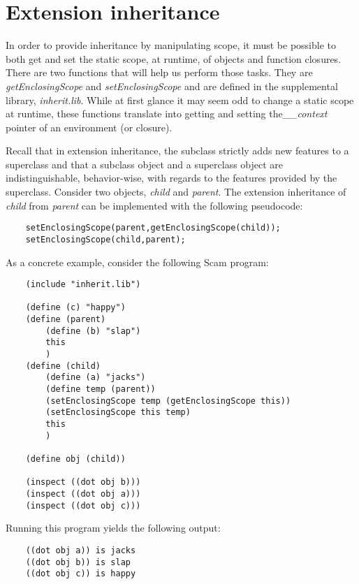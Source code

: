 \section{Extension inheritance}

In order to provide inheritance by manipulating scope, it must be
possible to both get and set the static scope, at runtime, of objects
and function closures.  There are two functions that will help us
perform those tasks. They are
{\it getEnclosingScope} and {\it setEnclosingScope} and are defined
in the supplemental library, {\it inherit.lib}.
While at first
glance it may seem odd to change a static scope at runtime,
these functions translate into getting and setting
the{\it  \_\_context} pointer of an environment (or closure).

Recall that in extension inheritance, the subclass strictly adds
new features to a superclass and that a subclass object and a
superclass object are indistinguishable, behavior-wise, with regards
to the features provided by the superclass.  
Consider two objects, {\it child} and {\it parent}. The extension
inheritance of {\it child} from {\it parent} can be implemented with
the following pseudocode:

\begin{verbatim}
    setEnclosingScope(parent,getEnclosingScope(child));
    setEnclosingScope(child,parent);
\end{verbatim}

As a concrete example, consider the following Scam program:

\begin{verbatim}
    (include "inherit.lib")

    (define (c) "happy")
    (define (parent)
        (define (b) "slap")
        this
        )
    (define (child)
        (define (a) "jacks")
        (define temp (parent))
        (setEnclosingScope temp (getEnclosingScope this))
        (setEnclosingScope this temp)
        this
        )

    (define obj (child))

    (inspect ((dot obj b)))
    (inspect ((dot obj a)))
    (inspect ((dot obj c)))
\end{verbatim}

Running this program yields the following output:

\begin{verbatim}
    ((dot obj a)) is jacks
    ((dot obj b)) is slap
    ((dot obj c)) is happy
\end{verbatim}

